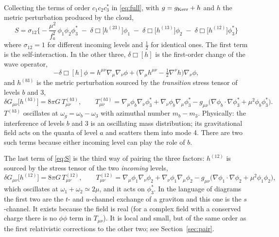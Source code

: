 \documentclass[11pt]{article}
\begin{document}
Collecting the terms of order $c_1c_2c_3^*$ in \eqref{eq:full}, with $g=g_{\rm Kerr}+h$ and $h$ the metric perturbation produced by the cloud,
\begin{equation}
\boxed{\;S=\sigma_{12}\Big\{-\frac{\mu^2}{f_a^2}\,\phi_1\phi_2\phi_3^*
\;-\;\delta\Box\big[h^{(23)}\big]\phi_1\;-\;\delta\Box\big[h^{(13)}\big]\phi_2\;-\;\delta\Box\big[h^{(12)}\big]\phi_3^*\Big\}\;} \label{eq:S}
\end{equation}
where $\sigma_{12}=1$ for different incoming levels and $\tfrac12$ for identical ones. The first term is the self-interaction.
In the other three, $\delta\Box[h]$ is the first-order change of the wave operator,
\begin{equation}
-\delta\Box[h]\phi=h^{\mu\nu}\nabla_\mu\nabla_\nu\phi+\big(\nabla_\mu h^{\mu\nu}-\tfrac12\nabla^\nu h\big)\nabla_\nu\phi , \label{eq:dbox}
\end{equation}
and $h^{(b3)}$ is the metric perturbation sourced by the \emph{transition} stress tensor of levels $b$ and 3,
\begin{equation}
\delta G_{\mu\nu}\big[h^{(b3)}\big]=8\pi G\,T^{(b3)}_{\mu\nu},\qquad
T^{(b3)}_{\mu\nu}=\nabla_\mu\phi_b\nabla_\nu\phi_3^*+\nabla_\nu\phi_b\nabla_\mu\phi_3^*
-g_{\mu\nu}\big(\nabla\phi_b\!\cdot\!\nabla\phi_3^*+\mu^2\phi_b\phi_3^*\big). \label{eq:lin}
\end{equation}
$T^{(b3)}$ oscillates at $\omega_g=\omega_b-\omega_3$ with azimuthal number $m_b-m_3$. Physically: the interference of levels $b$ and 3
is an oscillating mass distribution; its gravitational field acts on the quanta of level $a$ and scatters them into mode 4.
There are two such terms because either incoming level can play the role of $b$.

The last term of \eqref{eq:S} is the third way of pairing the three factors: $h^{(12)}$ is sourced by the stress tensor of the two
\emph{incoming} levels,
\begin{equation}
\delta G_{\mu\nu}\big[h^{(12)}\big]=8\pi G\,T^{(12)}_{\mu\nu},\qquad
T^{(12)}_{\mu\nu}=\nabla_\mu\phi_1\nabla_\nu\phi_2+\nabla_\nu\phi_1\nabla_\mu\phi_2
-g_{\mu\nu}\big(\nabla\phi_1\!\cdot\!\nabla\phi_2+\mu^2\phi_1\phi_2\big), \label{eq:pair}
\end{equation}
which oscillates at $\omega_1+\omega_2\simeq2\mu$, and it acts on $\phi_3^*$. In the language of diagrams the first two are the $t$- and
$u$-channel exchange of a graviton and this one is the $s$-channel. It exists because the field is real (for a complex field with a
conserved charge there is no $\phi\phi$ term in $T_{\mu\nu}$). It is local and small, but of the same order as the first relativistic
corrections to the other two; see Section~\ref{sec:pair}.
\end{document}
